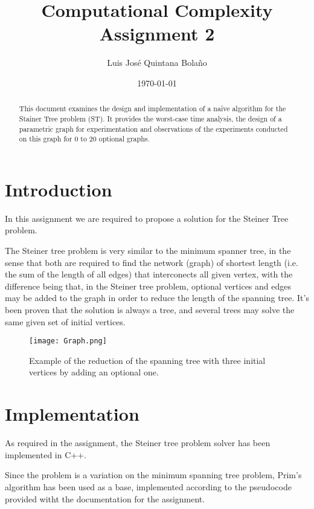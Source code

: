 \documentclass[a4paper]{article}
\title{Computational Complexity\\ Assignment 2 }
\author{Luis José Quintana Bolaño}
\date{\today}
\begin{document}
	\maketitle
	\begin{abstract}
	    This document examines the design and implementation of a naïve algorithm for the Stainer Tree problem (ST). It provides the worst-case time analysis, the design of a parametric graph for experimentation and observations of the experiments conducted on this graph for 0 to 20 optional graphs.
  	\end{abstract}
  	
	\section{Introduction}
	    In this assignment we are required to propose a solution for the Steiner Tree problem.
	    
	    The Steiner tree problem is very similar to the minimum spanner tree, in the sense that both are required to find the network (graph) of shortest length (i.e. the sum of the length of all edges) that interconects all given vertex, with the difference being that, in the Steiner tree problem, optional vertices and edges may be added to the graph in order to reduce the length of the spanning tree. It's been proven that the solution is always a tree, and several trees may solve the same given set of initial vertices.
		    \begin{figure}[!h]
  			\centering
  			\texttt{[image: Graph.png]}
  			\caption{Example of the reduction of the spanning tree with three initial vertices by adding an optional one.}
  			\end{figure}
    
    
    \section{Implementation}
    As required in the assignment, the Steiner tree problem solver has been implemented in C++.
    
    Since the problem is a variation on the minimum spanning tree problem, Prim's algorithm has been used as a base, implemented according to the pseudocode provided witht the documentation for the assignment.
    
\end{document}
